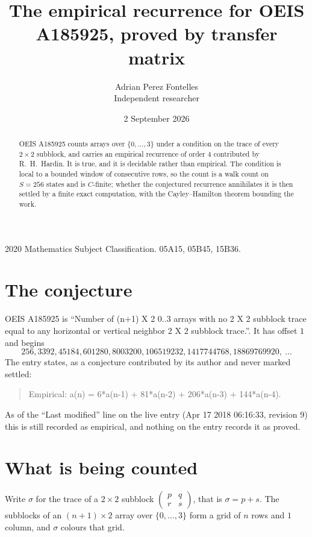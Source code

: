 \documentclass[11pt,a4paper]{article}
\title{The empirical recurrence for OEIS A185925, proved by transfer matrix}
\author{Adrian Perez Fontelles\\ \small Independent researcher}
\date{2 September 2026}
\theoremstyle{plain}
\theoremstyle{definition}
\begin{document}
\maketitle

\begin{abstract}
OEIS A185925 counts arrays over $\{0,\dots,3\}$ under a condition on the trace of every
$2\times2$ subblock, and carries an empirical recurrence of order $4$ contributed by
R.~H.~Hardin. It is true, and it is decidable rather than empirical. The condition is local to
a bounded window of consecutive rows, so the count is a walk count on $S=256$ states and is
$C$-finite; whether the conjectured recurrence annihilates it is then settled by a finite exact
computation, with the Cayley--Hamilton theorem bounding the work.
\end{abstract}

\noindent\small 2020 Mathematics Subject Classification. 05A15, 05B45, 15B36.\normalsize

\section{The conjecture}

OEIS A185925 is ``Number of (n+1) X 2 0..3 arrays with no 2 X 2 subblock trace equal to any horizontal or vertical neighbor 2 X 2 subblock trace.''. It has offset $1$ and begins
\[
256, 3392, 45184, 601280, 8003200, 106519232, 1417744768, 18869769920,\ \dots
\]
The entry states, as a conjecture contributed by its author and never marked settled:
\begin{quote}
Empirical: a(n) = 6*a(n-1) + 81*a(n-2) + 206*a(n-3) + 144*a(n-4).
\end{quote}
As of the ``Last modified'' line on the live entry (Apr 17 2018 06:16:33, revision 9) this is still
recorded as empirical, and nothing on the entry records it as proved.

\section{What is being counted}

Write $\sigma$ for the trace of a $2\times2$ subblock
$\begin{pmatrix}p&q\\r&s\end{pmatrix}$, that is $\sigma=p+s$. The subblocks of an
$(n+1)\times2$ array over $\{0,\dots,3\}$ form a grid of $n$ rows and $1$
column, and $\sigma$ colours that grid.
\end{document}
